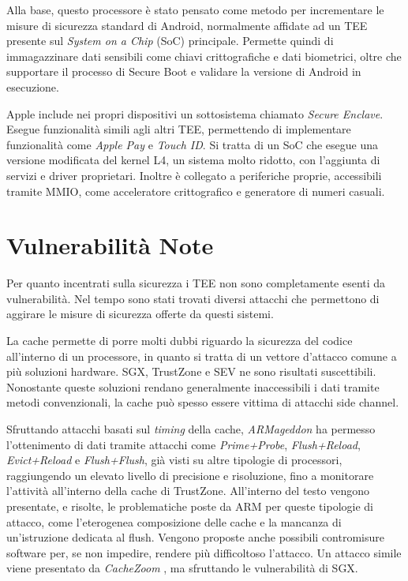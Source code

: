 \documentclass[12pt,italian]{report}
\begin{document}
	Alla base, questo processore è stato pensato come metodo per incrementare le misure di sicurezza standard di Android, normalmente affidate ad un TEE presente sul \textit{System on a Chip} (SoC) principale. Permette quindi di immagazzinare dati sensibili come chiavi crittografiche e dati biometrici, oltre che supportare il processo di Secure Boot e validare la versione di Android in esecuzione.
	
	\bigbreak 
	
	Apple include nei propri dispositivi un sottosistema chiamato \textit{Secure Enclave}. Esegue funzionalità simili agli altri TEE, permettendo di implementare funzionalità come \textit{Apple Pay} e \textit{Touch ID}. Si tratta di un SoC che esegue una versione modificata del kernel L4, un sistema molto ridotto, con l'aggiunta di servizi e driver proprietari. Inoltre è collegato a periferiche proprie, accessibili tramite MMIO, come acceleratore crittografico e generatore di numeri casuali.
	
	\section{Vulnerabilità Note}
	\label{sec:vulnerabilità}
	Per quanto incentrati sulla sicurezza i TEE non sono completamente esenti da vulnerabilità. Nel tempo sono stati trovati diversi attacchi che permettono di aggirare le misure di sicurezza offerte da questi sistemi.
	
	\bigbreak 
	
	La cache permette di porre molti dubbi riguardo la sicurezza del codice all'interno di un processore, in quanto si tratta di un vettore d'attacco comune a più soluzioni hardware. SGX, TrustZone e SEV ne sono risultati suscettibili. Nonostante queste soluzioni rendano generalmente inaccessibili i dati tramite metodi convenzionali, la cache può spesso essere vittima di attacchi side channel.
	
	Sfruttando attacchi basati sul \textit{timing} della cache, \textit{ARMageddon} \cite{armageddon} ha permesso l'ottenimento di dati tramite attacchi come \textit{Prime+Probe}, \textit{Flush+Reload}, \textit{Evict+Reload} e \textit{Flush+Flush}, già visti su altre tipologie di processori, raggiungendo un elevato livello di precisione e risoluzione, fino a monitorare l'attività all'interno della cache di TrustZone. All'interno del testo vengono presentate, e risolte, le problematiche poste da ARM per queste tipologie di attacco, come l'eterogenea composizione delle cache e la mancanza di un'istruzione dedicata al flush. Vengono proposte anche possibili contromisure software per, se non impedire, rendere più difficoltoso l'attacco. Un attacco simile viene presentato da \textit{CacheZoom} \cite{cachezoom}, ma sfruttando le vulnerabilità di SGX.
	
\end{document}
